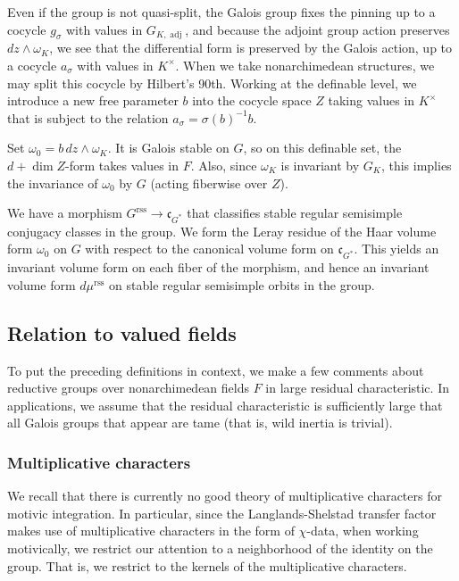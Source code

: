 \documentclass[12pt]{amsart}
\newcommand{\op}[1]{\operatorname{#1}}
\newcommand{\fc}{\mathfrak{c}}
\newcommand{\reg}{\mathrm{rss}}
\theoremstyle{plain}
\theoremstyle{definition}
\begin{document}
Even if the group is not quasi-split, the Galois group fixes the
pinning up to a cocycle $g_\sigma$ with values in $G_{K,\op{adj}}$,
and because the adjoint group action preserves $dz\land \omega_K$, we
see that the differential form is preserved by the Galois action, up
to a cocycle $a_\sigma$ with values in $K^\times$.  When we take
nonarchimedean structures, we may split this cocycle by Hilbert's
90th.  Working at the definable level, we introduce a new free
parameter $b$ into the cocycle space $Z$ taking values in $K^\times$
that is subject to the relation $a_\sigma = \sigma(b)^{-1} b$.

Set $\omega_0 = b\, dz\land\omega_K$.  It is Galois stable on
$G$, so on this definable set, the $d+\dim Z$-form takes values in $F$.
Also, since $\omega_K$ is invariant by $G_K$, this implies the
invariance of $\omega_0$ by $G$ (acting fiberwise over $Z$).  

We have a morphism $G^\reg\to \fc_{G^*}$ that classifies stable
regular semisimple conjugacy classes in the group.  We form the Leray
residue of the Haar volume form $\omega_0$ on $G$ with respect to the
canonical volume form on $\fc_{G^*}$.  This yields an invariant volume
form on each fiber of the morphism, and hence an invariant volume form
$d\mu^\reg$ on stable regular semisimple orbits in the group.

\subsection{Relation to valued fields}

To put the preceding definitions in context, we make a few comments
about reductive groups over nonarchimedean fields $F$ in large
residual characteristic.  In applications, we assume that the residual
characteristic is sufficiently large that all Galois groups that
appear are tame (that is, wild inertia is trivial).

\subsubsection{Multiplicative characters}

We recall that there is currently no good theory of multiplicative
characters for motivic integration.  In particular, since the
Langlands-Shelstad transfer factor makes use of multiplicative
characters in the form of $\chi$-data, when working motivically,
we restrict our attention to a neighborhood of the identity on the
group.  That is, we restrict to the kernels of the multiplicative
characters.
\end{document}
